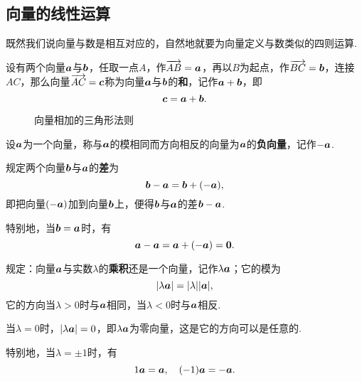 \subsection{向量的线性运算}
既然我们说向量与数是相互对应的，自然地就要为向量定义与数类似的四则运算.

\begin{definition}[向量的加法]
设有两个向量\(\boldsymbol{a}\)与\(\boldsymbol{b}\)，任取一点\(A\)，作\(\overrightarrow{AB}=\boldsymbol{a}\)，再以\(B\)为起点，作\(\overrightarrow{BC}=\boldsymbol{b}\)，连接\(AC\)，那么向量\(\overrightarrow{AC}=\boldsymbol{c}\)称为向量\(\boldsymbol{a}\)与\(\boldsymbol{b}\)的\textbf{和}，记作\(\boldsymbol{a}+\boldsymbol{b}\)，即\[
\boldsymbol{c}=\boldsymbol{a}+\boldsymbol{b}.
\]
\begin{figure}[ht]
\centering
{}
\caption{向量相加的三角形法则}
\label{figure:解析几何.向量相加的三角形法则}
\end{figure}
\end{definition}

\begin{definition}[负向量]
设\(\boldsymbol{a}\)为一个向量，称与\(\boldsymbol{a}\)的模相同而方向相反的向量为\(\boldsymbol{a}\)的\textbf{负向量}，记作\(-\boldsymbol{a}\).
\end{definition}

\begin{definition}[向量的减法]
规定两个向量\(\boldsymbol{b}\)与\(\boldsymbol{a}\)的\textbf{差}为\[
\boldsymbol{b}-\boldsymbol{a}=\boldsymbol{b}+(-\boldsymbol{a}),
\]即把向量\((-\boldsymbol{a})\)加到向量\(\boldsymbol{b}\)上，便得\(\boldsymbol{b}\)与\(\boldsymbol{a}\)的差\(\boldsymbol{b}-\boldsymbol{a}\).

特别地，当\(\boldsymbol{b}=\boldsymbol{a}\)时，有\[
\boldsymbol{a}-\boldsymbol{a}=\boldsymbol{a}+(-\boldsymbol{a})=\boldsymbol{0}.
\]
\end{definition}

\begin{definition}[向量与数的乘法]
规定：向量\(\boldsymbol{a}\)与实数\(\lambda\)的\textbf{乘积}还是一个向量，记作\(\lambda\boldsymbol{a}\)；它的模为\[
\abs{\lambda\boldsymbol{a}}=\abs{\lambda}\abs{\boldsymbol{a}},
\]它的方向当\(\lambda>0\)时与\(\boldsymbol{a}\)相同，当\(\lambda<0\)时与\(\boldsymbol{a}\)相反.

当\(\lambda=0\)时，\(\abs{\lambda\boldsymbol{a}}=0\)，即\(\lambda\boldsymbol{a}\)为零向量，这是它的方向可以是任意的.

特别地，当\(\lambda=\pm 1\)时，有\[
1 \boldsymbol{a} = \boldsymbol{a}, \quad (-1) \boldsymbol{a} = -\boldsymbol{a}.
\]
\end{definition}

